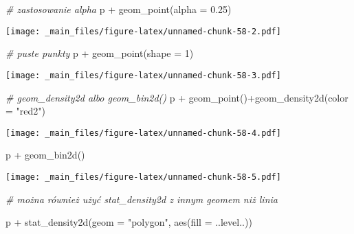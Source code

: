 \documentclass[
]{book}
\newenvironment{Shaded}{\begin{snugshade}}{\end{snugshade}}
\newcommand{\AttributeTok}[1]{\textcolor[rgb]{0.77,0.63,0.00}{#1}}
\newcommand{\CommentTok}[1]{\textcolor[rgb]{0.56,0.35,0.01}{\textit{#1}}}
\newcommand{\DecValTok}[1]{\textcolor[rgb]{0.00,0.00,0.81}{#1}}
\newcommand{\FloatTok}[1]{\textcolor[rgb]{0.00,0.00,0.81}{#1}}
\newcommand{\FunctionTok}[1]{\textcolor[rgb]{0.00,0.00,0.00}{#1}}
\newcommand{\NormalTok}[1]{#1}
\newcommand{\SpecialCharTok}[1]{\textcolor[rgb]{0.00,0.00,0.00}{#1}}
\newcommand{\StringTok}[1]{\textcolor[rgb]{0.31,0.60,0.02}{#1}}
\begin{document}
\begin{Shaded}
\begin{Highlighting}[]
\CommentTok{\# zastosowanie alpha}
\NormalTok{p }\SpecialCharTok{+} \FunctionTok{geom\_point}\NormalTok{(}\AttributeTok{alpha =} \FloatTok{0.25}\NormalTok{)}
\end{Highlighting}
\end{Shaded}

\texttt{[image: \_main\_files/figure-latex/unnamed-chunk-58-2.pdf]}

\begin{Shaded}
\begin{Highlighting}[]
\CommentTok{\# puste punkty}
\NormalTok{p }\SpecialCharTok{+} \FunctionTok{geom\_point}\NormalTok{(}\AttributeTok{shape =} \DecValTok{1}\NormalTok{)}
\end{Highlighting}
\end{Shaded}

\texttt{[image: \_main\_files/figure-latex/unnamed-chunk-58-3.pdf]}

\begin{Shaded}
\begin{Highlighting}[]
\CommentTok{\# geom\_density2d albo geom\_bin2d()}
\NormalTok{p }\SpecialCharTok{+} \FunctionTok{geom\_point}\NormalTok{()}\SpecialCharTok{+}\FunctionTok{geom\_density2d}\NormalTok{(}\AttributeTok{color =} \StringTok{"red2"}\NormalTok{)}
\end{Highlighting}
\end{Shaded}

\texttt{[image: \_main\_files/figure-latex/unnamed-chunk-58-4.pdf]}

\begin{Shaded}
\begin{Highlighting}[]
\NormalTok{p }\SpecialCharTok{+} \FunctionTok{geom\_bin2d}\NormalTok{()}
\end{Highlighting}
\end{Shaded}

\texttt{[image: \_main\_files/figure-latex/unnamed-chunk-58-5.pdf]}

\begin{Shaded}
\begin{Highlighting}[]
\CommentTok{\# można również użyć stat\_density2d z innym geomem niż linia}

\NormalTok{p }\SpecialCharTok{+} \FunctionTok{stat\_density2d}\NormalTok{(}\AttributeTok{geom =} \StringTok{"polygon"}\NormalTok{, }\FunctionTok{aes}\NormalTok{(}\AttributeTok{fill  =}\NormalTok{  ..level..))}
\end{Highlighting}
\end{Shaded}
\end{document}
